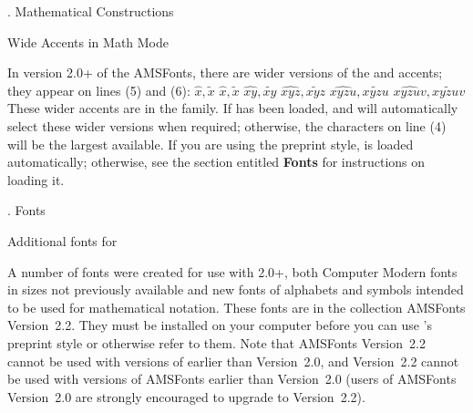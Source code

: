 . Mathematical Constructions
\endhead

\subhead Wide Accents in Math Mode \endsubhead

In version 2.0+ of the AMSFonts,
there are wider versions of the  and 
accents; they appear on lines (5) and (6):
\beginexample{}
 $\hat x, \tilde x$
 $\widehat x, \widetilde x$
  $\widehat{xy}, \widetilde{xy}$
  $\widehat{xyz}, \widetilde{xyz}$
  $\widehat{xyzu}, \widetilde{xyzu}$
  $\widehat{xyzuv}, \widetilde{xyzuv}$
\endexample
\noindent
These wider accents are in the  family.  If 
has been loaded,  and  will automatically
select these wider versions when required; otherwise, the characters
on line (4) will be the largest available.  If you are using the
preprint style,  is loaded automatically; otherwise,
see the section entitled {\bf Fonts} for instructions on loading it.



. Fonts\endhead

\subhead Additional fonts for \AmSTeX{}\endsubhead

A number of fonts were created for use with \AmSTeX{} 2.0+, both
Computer Modern fonts in sizes not previously available and new fonts
of alphabets and symbols intended to be used for mathematical notation.
These fonts are in the collection AMSFonts Version~2.2.  They must be
installed on your computer before you can use \AmSTeX{}'s preprint style
or otherwise refer to them.
Note that AMSFonts Version~2.2 cannot be used with versions of \AmSTeX{}
earlier than Version~2.0, and \AmSTeX{} Version~2.2 cannot be used with
versions of AMSFonts earlier than Version~2.0
(users of AMSFonts Version~2.0 are strongly encouraged to upgrade to
Version~2.2).

